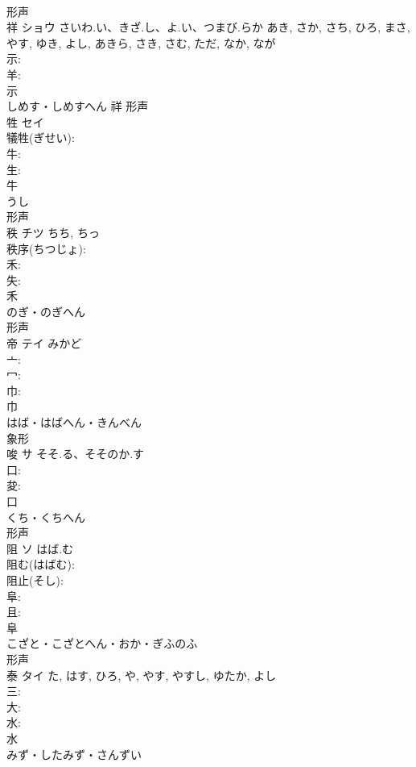 \documentclass[8pt]{extreport}
\begin{document}
\begin{CJK}{UTF8}{min}
\\	形声 
\\	祥	ショウ	さいわ.い、きざ.し、よ.い、つまび.らか	あき, さか, さち, ひろ, まさ, やす, ゆき, よし, あきら, さき, さむ, ただ, なか, なが	
\\	示: 
\\	羊: 
\\	示	
\\	しめす・しめすへん	祥	形声 
\\	牲	セイ			
\\	犠牲(ぎせい): 
\\	牛: 
\\	生: 
\\	牛	
\\	うし	
\\	形声 
\\	秩	チツ		ちち, ちっ	
\\	秩序(ちつじょ): 
\\	禾: 
\\	失: 
\\	禾	
\\	のぎ・のぎへん	
\\	形声 
\\	帝	テイ	みかど		
\\	亠: 
\\	冖: 
\\	巾: 
\\	巾	
\\	はば・はばへん・きんべん	
\\	象形 
\\	唆	サ	そそ.る、そそのか.す		
\\	口: 
\\	夋: 
\\	口	
\\	くち・くちへん	
\\	形声 
\\	阻	ソ	はば.む		
\\	阻む(はばむ): 
\\	阻止(そし): 
\\	阜: 
\\	且: 
\\	阜	
\\	こざと・こざとへん・おか・ぎふのふ	
\\	形声 
\\	泰	タイ		た, はす, ひろ, や, やす, やすし, ゆたか, よし	
\\	三: 
\\	大: 
\\	水: 
\\	水	
\\	みず・したみず・さんずい	

\end{CJK}
\end{document}
